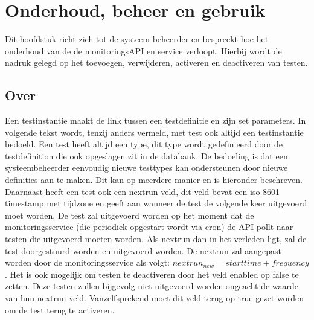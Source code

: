 \chapter{Onderhoud, beheer en gebruik}
{\samenvatting Dit hoofdstuk richt zich tot de systeem beheerder en bespreekt hoe het onderhoud van de de monitoringsAPI en service verloopt. Hierbij wordt de nadruk gelegd op het toevoegen, verwijderen, activeren en deactiveren van testen.}
\npar
\section{Over}
\npar
Een testinstantie maakt de link tussen een testdefinitie en zijn set parameters. In volgende tekst wordt, tenzij anders vermeld, met test ook altijd een testinstantie bedoeld. Een test heeft altijd een type, dit type wordt gedefinieerd door de testdefinition die ook opgeslagen zit in de databank. De bedoeling is dat een systeembeheerder eenvoudig nieuwe testtypes kan ondersteunen door nieuwe definities aan te maken. Dit kan op meerdere manier en is hieronder beschreven.
\npar
Daarnaast heeft een test ook een nextrun veld, dit veld bevat een iso 8601 timestamp met tijdzone en geeft aan wanneer de test de volgende keer uitgevoerd moet worden. De test zal uitgevoerd worden op het moment dat de monitoringsservice (die periodiek opgestart wordt via cron) de API pollt naar testen die uitgevoerd moeten worden. Als nextrun dan in het verleden ligt, zal de test doorgestuurd worden en uitgevoerd worden. De nextrun zal aangepast worden door de monitoringsservice als volgt: $nextrun_{new} = starttime + frequency$.
\npar
Het is ook mogelijk om testen te deactiveren door het veld enabled op false te zetten. Deze testen zullen bijgevolg niet uitgevoerd worden ongeacht de waarde van hun nextrun veld. Vanzelfsprekend moet dit veld terug op true gezet worden om de test terug te activeren.

